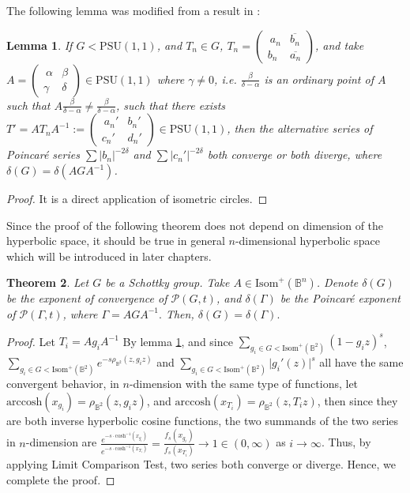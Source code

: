 \documentclass[12pt,oneside]{sfsuthesis}
\theoremstyle{plain} %
\newtheorem{theorem}{Theorem}[chapter]
\newtheorem{lemma}[theorem]{Lemma}
\theoremstyle{definition}  %
\theoremstyle{remark}  %
\theoremstyle{plain}
\begin{document}
{The following lemma was modified from a result in \cite[Section 47, P.107]{ford1929automorphic}:
\begin{lemma}\label{lemma 3.5}
If $G<\text{PSU}(1,1)$, and $T_n\in G$, $T_n=\begin{pmatrix}\
a_n &  \overline{b_n}\\
b_n &  \overline{a_n}
\end{pmatrix}$, and take $A=\begin{pmatrix}\
\alpha &  \beta \\
\gamma &  \delta
\end{pmatrix}\in \text{PSU}(1,1)$ where $\gamma\neq 0$, i.e. $\frac{\beta}{\delta-\alpha}$ is an ordinary point of $A$ such that $A\frac{\beta}{\delta-\alpha}\neq \frac{\beta}{\delta-\alpha}$, such that there exists $T'=AT_nA^{-1}:=\begin{pmatrix}\
a_n' &  b_n'\\
c_n' &  d_n'
\end{pmatrix}\in \text{PSU}(1,1)$, then the alternative series of Poincar\'{e} series $\sum\vert b_n\vert^{-2\delta}$ and $\sum\vert c_n'\vert^{-2\delta}$ both converge or both diverge, where $\delta(G)=\delta(AGA^{-1})$.
\end{lemma}
\begin{proof}
It is a direct application of isometric circles.
\end{proof}


Since the proof of the following theorem does not depend on dimension of the hyperbolic space, it should be true in general $n$-dimensional hyperbolic space which will be introduced in later chapters.
\begin{theorem}\label{n-dim poincare series}
Let $G$ be a Schottky group. Take $A\in\text{Isom}^+(\mathbb{B}^n)$. Denote $\delta(G)$ be the exponent of convergence of $\mathcal{P}(G,t)$, and $\delta(\Gamma)$ be the Poincar\'{e} exponent of $\mathcal{P}(\Gamma,t)$, where $\Gamma=AGA^{-1}.$ Then, $\delta(G)=\delta(\Gamma).$
\end{theorem}
\begin{proof}
Let $T_i=Ag_iA^{-1}$
By lemma \ref{lemma 3.5}, and since $\sum_{g_i\in G<\text{Isom}^+(\mathbb{B}^2)}\left( 1-g_iz\right)^{s}$,\\ $\sum_{g_i\in G<\text{Isom}^+(\mathbb{B}^2)}e^{-s\rho_{\mathbb{B}^2}(z,g_iz)}$ and $\sum_{g_i\in G<\text{Isom}^+(\mathbb{B}^2)}\vert g_i'(z)\vert^{s}$ all have the same convergent behavior, in $n$-dimension with the same type of functions, let $\text{arccosh}(x_{g_i})=\rho_{\mathbb{B}^2}(z,g_iz)$, and $\text{arccosh}(x_{T_i})=\rho_{\mathbb{B}^2}(z,T_iz)$, then since they are both inverse hyperbolic cosine functions, the two summands of the two series in $n$-dimension are $
\frac{e^{-s\cdot \text{cosh}^{-1}(x_{g_i})}}{e^{-s\cdot\text{cosh}^{-1}(x_{T_i})}}=\frac{f_s(x_{g_i})}{f_s(x_{T_i})}\longrightarrow 1\in(0,\infty)
$ as $i\to \infty$. Thus, by applying Limit Comparison Test, two series both converge or diverge. Hence, we complete the proof.
\end{proof}


}
\end{document}
